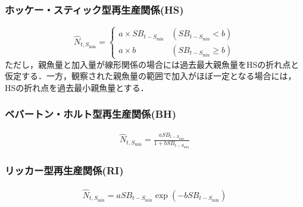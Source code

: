 \documentclass[11pt]{jsarticle}
\begin{document}
\subsubsection*{ホッケー・スティック型再生産関係(HS)}
\begin{equation}
  \hat{N}_{t,S_{\mathrm{min}}} = \begin{cases}
    a \times S\!B_{t-S_{\mathrm{min}}} & (S\!B_{t-S_{\mathrm{min}}} < b) \\
    a \times b                 & (S\!B_{t-S_{\mathrm{min}}} \geq b)
  \end{cases}
  \label{HS}
\end{equation}
ただし，親魚量と加入量が線形関係の場合には過去最大親魚量をHSの折れ点と仮定する．一方，観察された親魚量の範囲で加入がほぼ一定となる場合には，HSの折れ点を過去最小親魚量とする．

\subsubsection*{ベバートン・ホルト型再生産関係(BH)}
\begin{eqnarray}
  \hat{N}_{t,S_{\mathrm{min}}}=\frac{a S\!B_{t-S_{\mathrm{min}}}}{1 + b S\!B_{t-S_{\mathrm{min}}}}
  \label{BH1}
\end{eqnarray}

\subsubsection*{リッカー型再生産関係(RI)}
\begin{eqnarray}
  \hat{N}_{t,S_{\mathrm{min}}}= a S\!B_{t-S_{\mathrm{min}}}   \exp{(-b S\!B_{t-S_{\mathrm{min}}})}
  \label{RI1}
\end{eqnarray}

\end{document}
